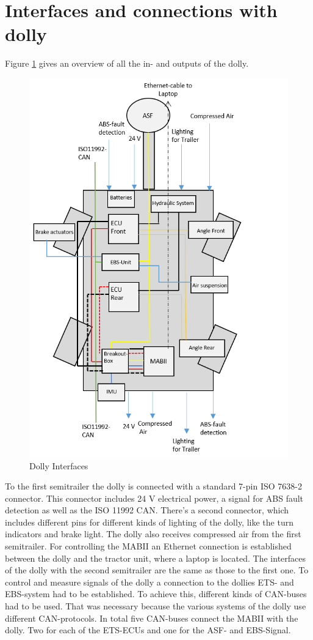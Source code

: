 \documentclass[ExampleMasters.tex]{subfiles}
\begin{document}
\section{Interfaces and connections with dolly}
\label{sec:interface_with_dolly}
Figure \ref{fig:dolly_interfaces} gives an overview of all the in- and outputs of the dolly.
\begin{figure}[h]
	\centering
	\includegraphics[width=0.5\linewidth]{figures/ExampleCover}
	\caption{Dolly Interfaces}
	\label{fig:dolly_interfaces}
\end{figure}
To the first semitrailer the dolly is connected with a standard 7-pin ISO 7638-2 connector. This connector includes 24 V electrical power, a signal for ABS fault detection as well as the ISO 11992 CAN.
There's a second connector, which includes different pins for different kinds of lighting of the dolly, like the turn indicators and brake light.
The dolly also receives compressed air from the first semitrailer.
For controlling the MABII an Ethernet connection is established between the dolly and the tractor unit, where a laptop is located. 
The interfaces of the dolly with the second semitrailer are the same as those to the first one.  
To control and measure signals of the dolly a connection to the dollies ETS- and EBS-system had to be established. To achieve this, different kinds of CAN-buses had to be used. That was necessary because the various systems of the dolly use different CAN-protocols. In total five CAN-buses connect the MABII with the dolly. Two for each of the ETS-ECUs and one for the ASF- and EBS-Signal.
\end{document}
